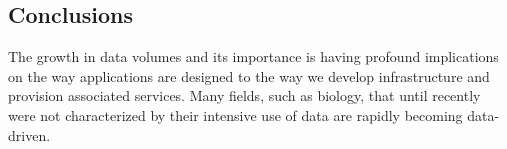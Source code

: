 






\subsection{Conclusions}
\label{sec:conclusion}

The growth in data volumes and its importance is having profound implications on
the way applications are designed to the way we develop infrastructure and
provision associated services.  Many fields, such as biology, that until
recently were not characterized by their intensive use of data are rapidly
becoming data-driven.


